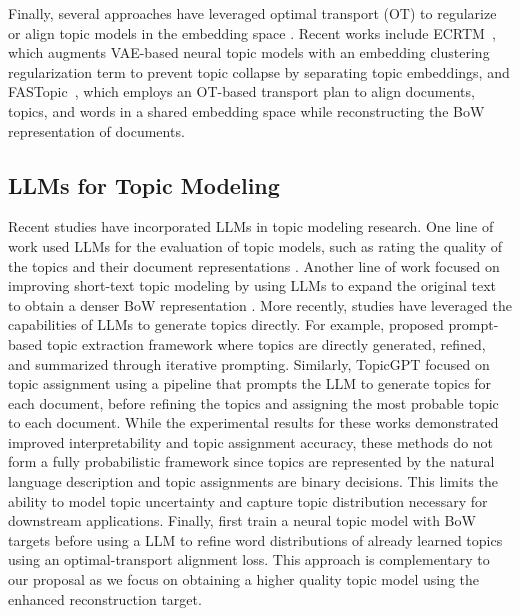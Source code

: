 \documentclass{article}
\theoremstyle{plain}
\theoremstyle{definition}
\theoremstyle{remark}
\begin{document}
Finally, several approaches have leveraged optimal transport (OT) to regularize or align topic models in the embedding space \citep{nan-etal-2019-topic, zhao2021neural, wang2022representing}. Recent works include ECRTM~\citep{wu2023effective}, which augments VAE-based neural topic models with an embedding clustering regularization term to prevent topic collapse by separating topic embeddings, and FASTopic~\citep{wu2024fastopic}, which employs an OT-based transport plan to align documents, topics, and words in a shared embedding space while reconstructing the BoW representation of documents.



\subsection{LLMs for Topic Modeling}
Recent studies have incorporated LLMs in topic modeling research. One line of work used LLMs for the evaluation of topic models, such as rating the quality of the topics \citep{stammbach-etal-2023-revisiting, rahimi-etal-2024-contextualized} and their document representations \citep{yang2025llm}. Another line of work focused on improving short-text topic modeling by using LLMs to expand the original text to obtain a denser BoW representation \citep{akash-chang-2024-enhancing}. More recently, studies have leveraged the capabilities of LLMs to generate topics directly. For example, \citet{mu-etal-2024-large} proposed prompt-based topic extraction framework where topics are directly generated, refined, and summarized through iterative prompting. Similarly, TopicGPT \citep{pham-etal-2024-topicgpt} focused on topic assignment using a pipeline that prompts the LLM to generate topics for each document, before refining the topics and assigning the most probable topic to each document. While the experimental results for these works demonstrated improved interpretability and topic assignment accuracy, these methods do not form a fully probabilistic framework since topics are represented by the natural language description and topic assignments are binary decisions. This limits the ability to model topic uncertainty and capture topic distribution necessary for downstream applications. 
Finally, \citet{yang-etal-2025-neural} first train a neural topic model with BoW targets before using a LLM to refine word distributions of already learned topics using an optimal-transport alignment loss. This approach is complementary to our proposal as we focus on obtaining a higher quality topic model using the enhanced reconstruction target.
\end{document}
